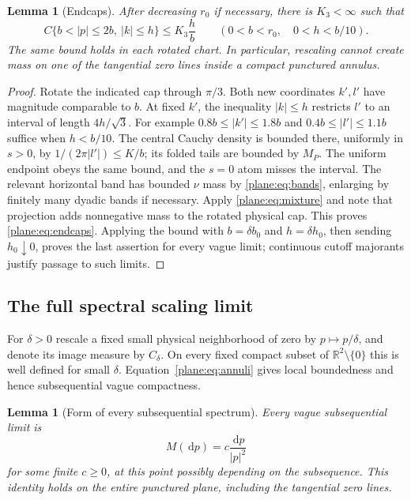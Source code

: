 \documentclass[11pt]{article}
\newcommand{\R}{\mathbb R}
\newcommand{\dd}{\,\mathrm d}
\newtheorem{lemma}[theorem]{Lemma}
\theoremstyle{definition}
\theoremstyle{remark}
\numberwithin{equation}{section}
\begin{document}
\begin{lemma}[Endcaps]
\label{lem:endcaps}
After decreasing $r_0$ if necessary, there is $K_3<\infty$ such that
\begin{equation}
 \label{plane:eq:endcaps}
 C\{b<|p|\le2b,\ |k|\le h\}\le K_3\frac hb
 \qquad(0<b<r_0,\quad0<h<b/10).
\end{equation}
The same bound holds in each rotated chart.  In particular, rescaling
cannot create mass on one of the tangential zero lines inside a compact
punctured annulus.
\end{lemma}

\begin{proof}
Rotate the indicated cap through $\pi/3$.  Both new coordinates $k',l'$
have magnitude comparable to $b$.  At fixed $k'$, the inequality
$|k|\le h$ restricts $l'$ to an interval of length $4h/\sqrt3$.
For example $0.8b\le|k'|\le1.8b$ and
$0.4b\le|l'|\le1.1b$ suffice when $h<b/10$.
The central Cauchy density is bounded there, uniformly in $s>0$, by
$1/(2\pi|l'|)\le K/b$; its folded tails are bounded by $M_P$.
The uniform endpoint obeys the same bound, and the $s=0$ atom misses
the interval.  The relevant horizontal band has bounded $\nu$ mass
by \eqref{plane:eq:bands}, enlarging by finitely many dyadic bands
if necessary.  Apply \eqref{plane:eq:mixture} and note that projection
adds nonnegative mass to the rotated physical cap.  This proves
\eqref{plane:eq:endcaps}.  Applying the bound with $b=\delta b_0$
and $h=\delta h_0$, then sending $h_0\downarrow0$, proves the last
assertion for every vague limit; continuous cutoff majorants justify
passage to such limits.
\end{proof}

\subsection{The full spectral scaling limit}

For $\delta>0$ rescale a fixed small physical neighborhood of zero by
$p\mapsto p/\delta$, and denote its image measure by $C_\delta$.
On every fixed compact subset of $\R^2\setminus\{0\}$ this is
well defined for small $\delta$.  Equation~\eqref{plane:eq:annuli}
gives local boundedness and hence subsequential vague compactness.

\begin{lemma}[Form of every subsequential spectrum]
\label{plane:lem:subsequences}
Every vague subsequential limit is
\begin{equation}
 \label{plane:eq:subsequence}
 M(\dd p)=c\frac{\dd p}{|p|^2}
\end{equation}
for some finite $c\ge0$, at this point possibly depending on the
subsequence.  This identity holds on the entire punctured plane,
including the tangential zero lines.
\end{lemma}
\end{document}
